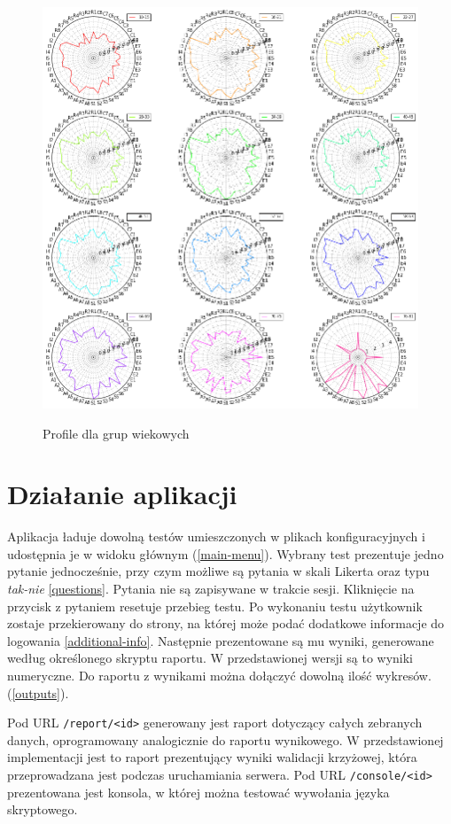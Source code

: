 \documentclass[12pt,a4paper,oneside]{report} %
\begin{document}
\begin{figure}
\centering
\includegraphics[width=1\textwidth]{profile.png}
\label{profile}
\caption{Profile dla grup wiekowych}
\end{figure}

\section{Działanie aplikacji}

Aplikacja ładuje dowolną testów umieszczonych w plikach konfiguracyjnych i udostępnia je w widoku głównym (\ref{main-menu}). Wybrany test prezentuje jedno pytanie jednocześnie, przy czym możliwe są pytania w skali Likerta oraz typu \emph{tak-nie} \ref{questions}. Pytania nie są zapisywane w trakcie sesji. Kliknięcie na przycisk z pytaniem resetuje przebieg testu.  Po wykonaniu testu użytkownik zostaje przekierowany do strony, na której może podać dodatkowe informacje do logowania \ref{additional-info}. Następnie prezentowane są mu wyniki, generowane według określonego skryptu raportu. W przedstawionej wersji są to wyniki numeryczne. Do raportu z wynikami można dołączyć dowolną ilość wykresów. (\ref{outputs}). \par

Pod URL \texttt{/report/<id>} generowany jest raport dotyczący całych zebranych danych, oprogramowany analogicznie do raportu wynikowego. W przedstawionej implementacji jest to raport prezentujący wyniki walidacji krzyżowej, która przeprowadzana jest podczas uruchamiania serwera. Pod URL \texttt{/console/<id>} prezentowana jest konsola, w której można testować wywołania języka skryptowego.\par
\end{document}
